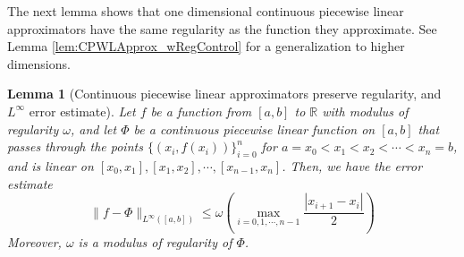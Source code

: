 \documentclass{article}
\numberwithin{equation}{section}
\newtheorem{lemma}{Lemma}[section]
\theoremstyle{definition}
\begin{document}
The next lemma shows that one dimensional continuous piecewise linear approximators have the same regularity as the function they approximate. See Lemma \ref{lem:CPWLApprox_wRegControl} for a generalization to higher dimensions.

\begin{lemma}[Continuous piecewise linear approximators preserve regularity, and $L^{\infty}$ error estimate]
\label{lem:continuous_piecewise_linear_approximators_preserve_regularity}
    Let $f$ be a function from $[a,b]$ to $\mathbb{R}$ with modulus of regularity $\omega$, and let $\Phi$ be a continuous piecewise linear function on $[a,b]$ that passes through the points $\{(x_i,f(x_i))\}_{i=0}^n$ for $a=x_0<x_1<x_2<\cdots<x_n=b$, and is linear on $[x_0,x_1],[x_1,x_2],\cdots,[x_{n-1},x_n]$. Then, we have the error estimate 
    $$\| f-\Phi \|_{L^{\infty}([a,b])} \le \omega \left(
    \max\limits_{i=0,1,\cdots,n-1}{\frac{|x_{i+1}-x_i|}{2}}
    \right)$$
    Moreover, $\omega$ is a modulus of regularity of $\Phi$. 
\end{lemma}
\end{document}
